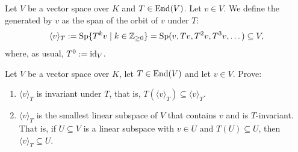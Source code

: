 \begin{definition}
  \label{def:T_cyclic_subspace}
  Let $V$ be a vector space over $K$ and $T \in \operatorname{End}(V)$. Let $v \in V$. We define the  generated by $v$ as the span of the orbit of $v$ under $T$:
  \[
  \langle v \rangle_T := \operatorname{Sp}\{T^k v \mid k \in \mathbb{Z}_{\ge 0}\} = \operatorname{Sp}(v, Tv, T^2v, T^3 v, \dots) \subseteq V,
  \]
  where, as usual, $T^0 := \operatorname{id}_V$.
\end{definition}

\begin{exercise}\label{ex:cyclic_minimal}
  Let $V$ be a vector space over $K$, let $T \in \operatorname{End}(V)$ and let $v \in V$. Prove:
  \begin{enumerate}[label=\textbf{(\alph*)}]
    \item $\langle v \rangle_T$ is invariant under $T$, that is, $T(\langle v \rangle_T) \subseteq \langle v \rangle_T$.
    \item $\langle v \rangle_T$ is the smallest linear subspace of $V$ that contains $v$ and is $T$-invariant. That is, if $U \subseteq V$ is a linear subspace with $v \in U$ and $T(U) \subseteq U$, then $\langle v \rangle_T \subseteq U$.
  \end{enumerate}
\end{exercise}

